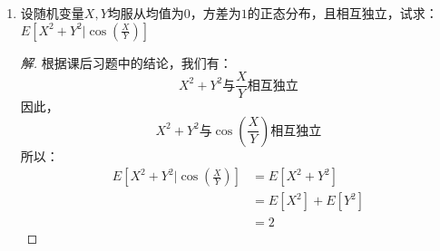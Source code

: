 \documentclass[12pt]{article}
\newcommand{\hei}{\CJKfamily{hei}}                          %
\begin{document}
\begin{enumerate}
\item {\hei 设随机变量$X,Y$均服从均值为$0$，方差为$1$的正态分布，且相互独立，试求：$E\left[X^2+Y^2|\cos\left(\frac{X}{Y}\right)\right]$}
\begin{proof}[解]
	根据课后习题中的结论，我们有：
	\begin{equation}
	X^2+Y^2\mbox{与}\frac{X}{Y}\mbox{相互独立}
	\end{equation}
	因此，
	\begin{equation}
	X^2+Y^2\mbox{与}\cos\left(\frac{X}{Y}\right)\mbox{相互独立}
	\end{equation}
	所以：
	\begin{equation}
	\begin{aligned}
	E\left[X^2+Y^2|\cos\left(\frac{X}{Y}\right)\right]&=E\left[X^2+Y^2\right] \\
	&=E\left[X^2\right]+E\left[Y^2\right] \\
	&=2
	\end{aligned}
	\end{equation}
\end{proof}


\end{enumerate}
\end{document}
